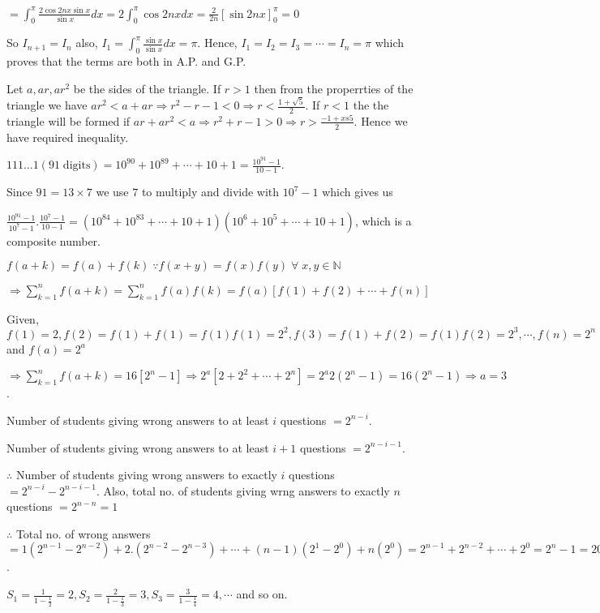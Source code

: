   $= \displaystyle\int_0^\pi\frac{2\cos2nx\sin x}{\sin x}dx = 2\int_0^\pi \cos 2nx dx =
  \frac{2}{2n}\left[\sin2nx\right]_0^\pi = 0$

  So $I_{n + 1} = I_n$ also, $I_1 = \displaystyle\int_0^\pi\frac{\sin x}{\sin x}dx = \pi$. Hence, $I_1 = I_2
  = I_3 = \cdots = I_n = \pi$ which proves that the terms are both in A.P. and G.P.
\item Let $a, ar, ar^2$ be the sides of the triangle. If $r > 1$ then from the properrties of the triangle
  we have $ar^2 < a + ar \Rightarrow r^2 - r - 1 < 0 \Rightarrow r < \frac{1 + \sqrt{5}}{2}$. If $r < 1$ the
  the triangle will be formed if $ar + ar^2 < a \Rightarrow r^2 + r - 1 > 0 \Rightarrow r > \frac{-1 + xs
    5}{2}$. Hence we have required inequality.
\item $111\ldots 1(91\;\mathrm{digits}) = 10^{90} + 10^{89} + \cdots + 10 + 1 = \frac{10^{91} - 1}{10 - 1}$.

  Since $91 = 13\times 7$ we use $7$ to multiply and divide with $10^7 - 1$ which gives us

  $\frac{10^{91} - 1}{10^7 - 1}.\frac{10^7 - 1}{10 - 1} = (10^{84} + 10^{83} + \cdots + 10 + 1)(10^6 + 10^5 +
  \cdots + 10 + 1)$, which is a composite number.
\item $f(a + k) = f(a) + f(k)\;\because f(x + y) = f(x)f(y)\;\forall\;x, y\in\mathbb{N}$

  $\Rightarrow \displaystyle \sum_{k = 1}^nf(a + k) = \sum_{k=1}^nf(a)f(k) = f(a)[f(1) + f(2) + \cdots +
  f(n)]$

  Given, $f(1) = 2, f(2) = f(1) + f(1) = f(1)f(1) = 2^2, f(3) = f(1) + f(2) = f(1)f(2) = 2^3, \cdots, f(n) =
  2^n$ and $f(a) = 2^a$

  $\Rightarrow \displaystyle \sum_{k = 1}^nf(a + k) = 16[2^n - 1] \Rightarrow 2^a[2 + 2^2 + \cdots + 2^n] =
  2^a2(2^n - 1) = 16(2^n - 1)\Rightarrow a = 3$.
\item Number of students giving wrong answers to at least $i$ questions $= 2^{n - i}$.

  Number of students giving wrong answers to at least $i + 1$ questions $= 2^{n - i - 1}$.

  $\therefore$ Number of students giving wrong answers to exactly $i$ questions $= 2^{n - i} - 2^{n - i -
    1}$. Also, total no. of students giving wrng answers to exactly $n$ questions $= 2^{n - n} = 1$

  $\therefore$ Total no. of wrong answers $= 1(2^{n - 1} - 2^{n - 2}) + 2.(2^{n - 2} - 2^{n - 3}) + \cdots +
  (n - 1)(2^1 - 2^0) + n(2^0) = 2^{n - 1} + 2^{n - 2} + \cdots + 2^0 = 2^n - 1 = 2047 \Rightarrow n = 11$.
\item $S_1 = \frac{1}{1 - \tfrac{1}{2}} = 2, S_2 = \frac{2}{1 - \tfrac{1}{3}} = 3, S_3 = \frac{3}{1 -
  \tfrac{1}{4}}= 4, \cdots$ and so on.

